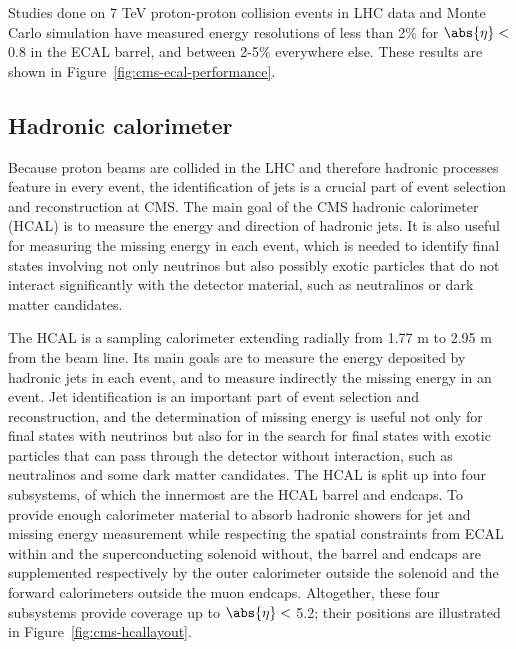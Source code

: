 Studies done on 7 TeV proton-proton collision events in LHC data and Monte Carlo simulation have measured energy resolutions of less than 2\% for $\abs{\eta} <$ 0.8 in the ECAL barrel, and between 2-5\% everywhere else. These results are shown in Figure~\ref{fig:cms-ecal-performance}.

\subsection{Hadronic calorimeter\label{sec:cms-hcal}}

Because proton beams are collided in the LHC and therefore hadronic processes feature in every event, the identification of jets is a crucial part of event selection and reconstruction at CMS. The main goal of the CMS hadronic calorimeter (HCAL) is to measure the energy and direction of hadronic jets. It is also useful for measuring the missing energy in each event, which is needed to identify final states involving not only neutrinos but also possibly exotic particles that do not interact significantly with the detector material, such as neutralinos or dark matter candidates.

The HCAL is a sampling calorimeter extending radially from 1.77 m to 2.95 m from the beam line. Its main goals are to measure the energy deposited by hadronic jets in each event, and to measure indirectly the missing energy in an event. Jet identification is an important part of event selection and reconstruction, and the determination of missing energy is useful not only for final states with neutrinos but also for in the search for final states with exotic particles that can pass through the detector without interaction, such as neutralinos and some dark matter candidates. The HCAL is split up into four subsystems, of which the innermost are the HCAL barrel and endcaps. To provide enough calorimeter material to absorb hadronic showers for jet and missing energy measurement while respecting the spatial constraints from ECAL within and the superconducting solenoid without, the barrel and endcaps are supplemented respectively by the outer calorimeter outside the solenoid and the forward calorimeters outside the muon endcaps. Altogether, these four subsystems provide coverage up to $\abs{\eta} <$ 5.2; their positions are illustrated in Figure~\ref{fig:cms-hcallayout}.

